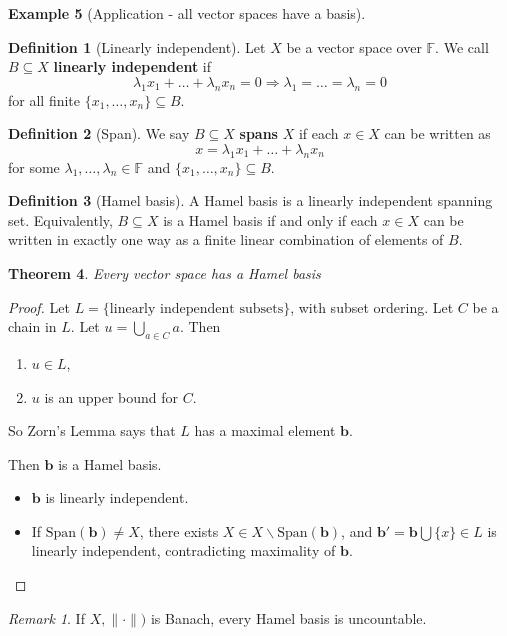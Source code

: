 \documentclass[10pt, oneside, reqno]{amsart}
\theoremstyle{plain}%
\newtheorem{thm}{Theorem}[section]
\theoremstyle{definition}
\newtheorem{defn}[thm]{Definition}
\newtheorem{exmp}[thm]{Example}
\theoremstyle{remark}
\newtheorem*{rem}{Remark}
\newcommand{\F}{\mathbb{F}}
\begin{document}
\begin{exmp}[Application - all vector spaces have a basis]
	\begin{defn}[Linearly independent]
		Let $X$ be a vector space over $\F$.  We call $B \subseteq X$ \textbf{linearly independent} if \[
			\lambda_1 x_1 + \dots + \lambda_n x_n = 0 \Rightarrow \lambda_1 = \dots = \lambda_n = 0
		\] for all finite $\{ x_1, \dots, x_n \} \subseteq B$. 
	\end{defn}
	
	\begin{defn}[Span]
		We say $B \subseteq X$ \textbf{spans} $X$ if each $x \in X$ can be written as \[
			x = \lambda_1 x_1 + \dots + \lambda_n x_n
		\] for some $\lambda_1, \dots, \lambda_n \in \F$ and $\{ x_1, \dots, x_n \} \subseteq B$. 
	\end{defn}
	
	\begin{defn}[Hamel basis]
		A Hamel basis is a linearly independent spanning set. Equivalently, $B \subseteq X$ is a Hamel basis if and only if each $x \in X$ can be written in exactly one way as a finite linear combination of elements of $B$.
	\end{defn}
	
	\begin{thm}
		Every vector space has a Hamel basis
	\end{thm}
	
	\begin{proof}
		Let $L = \{ \text{linearly independent subsets} \}$, with subset ordering.  Let $C$ be a chain in $L$.  Let $u = \bigcup_{a \in C} a$.  Then 
		\begin{enumerate}[(1)]
			\item $u \in L$,
			\item $u$ is an upper bound for $C$.
		\end{enumerate}  
		So Zorn's Lemma says that $L$ has a maximal element $\mathbf{b}$.  
		
		Then $\mathbf{b}$ is a Hamel basis. 
		\begin{itemize}
			\item $\mathbf{b}$ is linearly independent.  
			\item If $\text{Span}(\mathbf{b}) \neq X$, there exists $X \in X \backslash \text{Span}(\mathbf{b})$, and $\mathbf{b'} = \mathbf{b} \bigcup \{ x \} \in L$ is linearly independent, contradicting maximality of $\mathbf{b}$.
		\end{itemize}  
	\end{proof}
	
	\begin{rem}
		If $ X, \| \cdot \| )$ is Banach, every Hamel basis is uncountable.
	\end{rem}
\end{exmp}
\end{document}
